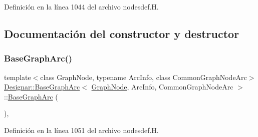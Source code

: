 Definición en la línea 1044 del archivo nodesdef.\+H.



\subsection{Documentación del constructor y destructor}
\mbox{\label{class_designar_1_1_base_graph_arc_ab68bc29411653f2d8b12d3ccc5efc1e7}} 
\subsubsection{\texorpdfstring{Base\+Graph\+Arc()}{BaseGraphArc()}\hspace{0.1cm}{\footnotesize\ttfamily [1/4]}}
{\footnotesize\ttfamily template$<$class Graph\+Node, typename Arc\+Info, class Common\+Graph\+Node\+Arc$>$ \\
\hyperlink{class_designar_1_1_base_graph_arc}{Designar\+::\+Base\+Graph\+Arc}$<$ \hyperlink{class_designar_1_1_graph_node}{Graph\+Node}, Arc\+Info, Common\+Graph\+Node\+Arc $>$\+::\hyperlink{class_designar_1_1_base_graph_arc}{Base\+Graph\+Arc} (\begin{DoxyParamCaption}{ }\end{DoxyParamCaption})\hspace{0.3cm}{\ttfamily [inline]}, {\ttfamily [protected]}}



Definición en la línea 1051 del archivo nodesdef.\+H.

\mbox{\label{class_designar_1_1_base_graph_arc_a1a789ba5e3fdb980a066bb56aa258681}} 
